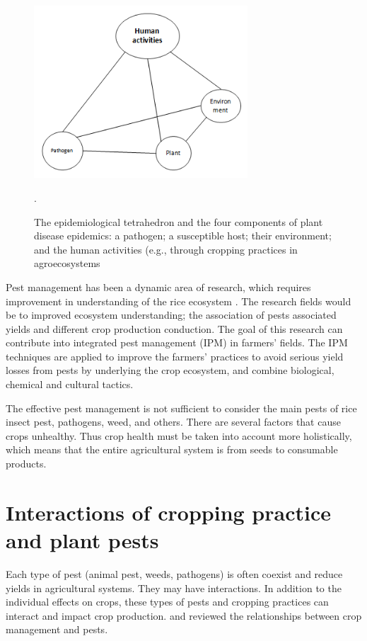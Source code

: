 \begin{figure}
\includegraphics[width=8cm]{distriangle}
\centering
\caption{The epidemiological tetrahedron and the four components of plant disease epidemics: a pathogen; a susceptible host; their environment; and the human activities (e.g., through cropping practices in agroecosystems}.
\label{fig:diseasetriangle}
\end{figure}

Pest management has been a dynamic area of research, which requires improvement in understanding of the rice ecosystem \citet{savary}. The research fields would be to improved ecosystem understanding; the association of pests associated yields and different crop production conduction. The goal of this research can contribute into integrated pest management (IPM) in farmers' fields. The IPM techniques are applied to improve the farmers' practices to avoid serious yield losses from pests by underlying the crop ecosystem, and combine biological, chemical and cultural tactics. 

The effective pest management is not sufficient to consider the main pests of rice insect pest, pathogens, weed, and others. There are several factors that cause crops unhealthy. Thus crop health must be taken into account more holistically, which means that the entire agricultural system is from seeds to consumable products. 

\section*{Interactions of cropping practice and plant pests}

Each type of pest (animal pest, weeds, pathogens) is often coexist and reduce yields in agricultural systems. They may have interactions. In addition to the individual effects on crops, these types of pests and cropping practices can interact and impact crop production. \cite{ouricedisease, ho1994weed, cohen1998importance} and \cite{Mew:2004kh} reviewed the relationships between crop management and pests. 

